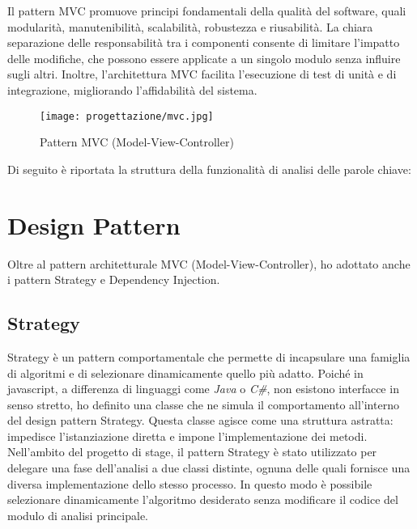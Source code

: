 \vspace{5pt}
\par\noindent Il pattern MVC promuove principi fondamentali della qualità del software, quali modularità, manutenibilità, scalabilità, robustezza e riusabilità. La chiara separazione delle responsabilità tra i componenti consente di limitare l’impatto delle modifiche, che possono essere applicate a un singolo modulo senza influire sugli altri. Inoltre, l’architettura MVC facilita l’esecuzione di test di unità e di integrazione, migliorando l’affidabilità del sistema.

\begin{figure}[H] 
    \centering 
    \texttt{[image: progettazione/mvc.jpg]} 
    \caption{Pattern MVC (Model-View-Controller)}
\end{figure}

\par\noindent 
\begin{minipage}{\textwidth}
  Di seguito è riportata la struttura della funzionalità di analisi delle parole chiave:
  \vspace{10pt}
\end{minipage}

\section{Design Pattern}
\label{sec:design-pattern}

\par Oltre al pattern architetturale MVC (Model-View-Controller), ho adottato anche i pattern Strategy e Dependency Injection.

\subsection{Strategy}

\par Strategy è un pattern comportamentale che permette di incapsulare una famiglia di algoritmi e di selezionare dinamicamente quello più adatto. Poiché in \gls{javascript}, a differenza di linguaggi come \textit{Java} o \textit{C\#}, non esistono interfacce in senso stretto, ho definito una classe che ne simula il comportamento all’interno del design  pattern Strategy. Questa classe agisce come una struttura astratta: impedisce l'istanziazione diretta e impone l’implementazione dei metodi. Nell’ambito del progetto di stage, il pattern Strategy è stato utilizzato per delegare una fase dell’analisi a due classi distinte, ognuna delle quali fornisce una diversa implementazione dello stesso processo. In questo modo è possibile selezionare dinamicamente l’algoritmo desiderato senza modificare il codice del modulo di analisi principale.

